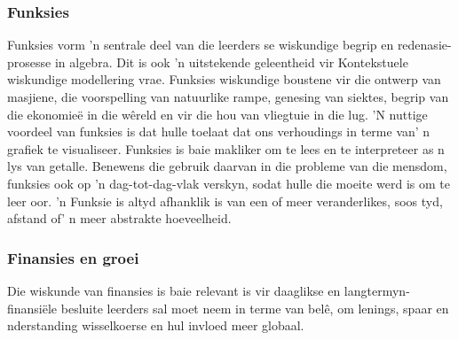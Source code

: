 \subsubsection{Funksies}
Funksies vorm 'n sentrale deel van die leerders se wiskundige begrip en redenasie-prosesse in algebra. Dit is ook 'n uitstekende geleentheid vir Kontekstuele wiskundige modellering vrae. Funksies wiskundige boustene vir die ontwerp van masjiene, die voorspelling van natuurlike rampe, genesing van siektes, begrip van die ekonomieë in die wêreld en vir die hou van vliegtuie in die lug. 'N nuttige voordeel van funksies is dat hulle toelaat dat ons verhoudings in terme van' n grafiek te visualiseer. Funksies is baie makliker om te lees en te interpreteer as n lys van getalle. Benewens die gebruik daarvan in die probleme van die mensdom, funksies ook op 'n dag-tot-dag-vlak verskyn, sodat hulle die moeite werd is om te leer oor. 'n Funksie is altyd afhanklik is van een of meer veranderlikes, soos tyd, afstand of' n meer abstrakte hoeveelheid.

\subsubsection{Finansies en groei}
Die wiskunde van finansies is baie relevant is vir daaglikse en langtermyn-finansiële besluite leerders sal moet neem in terme van belê, om lenings, spaar en nderstanding wisselkoerse en hul invloed meer globaal.

